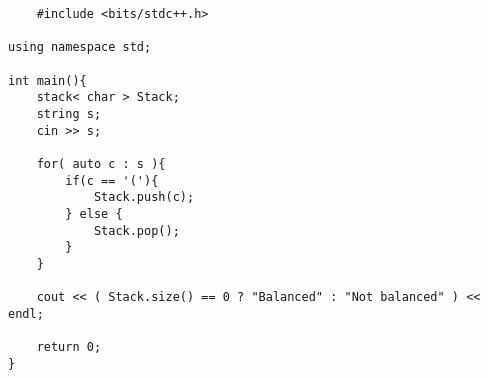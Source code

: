 \begin{lstlisting}
    #include <bits/stdc++.h>

using namespace std;

int main(){
    stack< char > Stack;
    string s;
    cin >> s;

    for( auto c : s ){
        if(c == '('){
            Stack.push(c);
        } else {
            Stack.pop();
        }
    }

    cout << ( Stack.size() == 0 ? "Balanced" : "Not balanced" ) << endl;
    
    return 0;
}
\end{lstlisting}